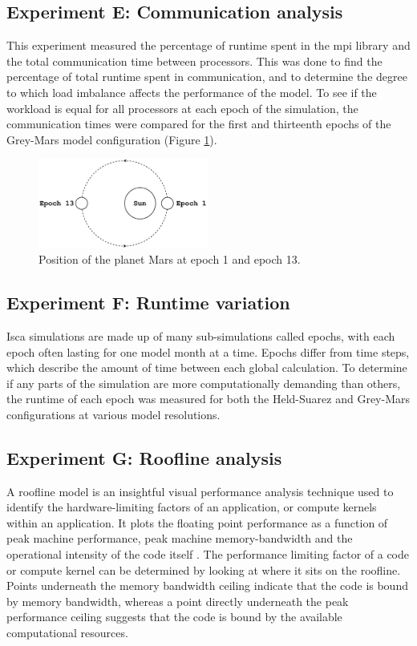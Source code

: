 \documentclass[a4paper,11pt]{report}
\begin{document}
\subsection{Experiment E: Communication analysis}
This experiment measured the percentage of runtime spent in the \gls{mpi} library and the total communication time between processors. This was done to find the percentage of total runtime spent in communication, and to determine the degree to which load imbalance affects the performance of the model. To see if the workload is equal for all processors at each epoch of the simulation, the communication times were compared for the first and thirteenth epochs of the Grey-Mars model configuration (Figure \ref{fig:orbits}). 

\begin{figure}[htbp]
\begin{center}
\includegraphics[width=0.5\textwidth]{img/orbit.pdf}
\caption{Position of the planet Mars at epoch 1 and epoch 13.}
\label{fig:orbits}
\end{center}
\end{figure}

\subsection{Experiment F: Runtime variation}
Isca simulations are made up of many sub-simulations called epochs, with each epoch often lasting for one model month at a time. Epochs differ from time steps, which describe the amount of time between each global calculation. To determine if any parts of the simulation are more computationally demanding than others, the runtime of each epoch was measured for both the Held-Suarez and Grey-Mars configurations at various model resolutions. 

\subsection{Experiment G: Roofline analysis}
A roofline model is an insightful visual performance analysis technique used to identify the hardware-limiting factors of an application, or compute kernels within an application. It plots the floating point performance as a function of peak machine performance, peak machine memory-bandwidth and the operational intensity of the code itself \cite{williams2009roofline}. The performance limiting factor of a code or compute kernel can be determined by looking at where it sits on the roofline. Points underneath the memory bandwidth ceiling indicate that the code is bound by memory bandwidth, whereas a point directly underneath the peak performance ceiling suggests that the code is bound by the available computational resources.
\end{document}
